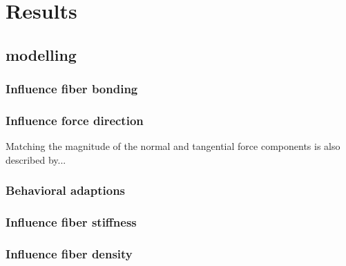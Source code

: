 \chapter{Results}\label{ch:results}

\section{modelling}

\subsection{Influence fiber bonding}\label{sec:results_fiber_bonding}
\subsection{Influence force direction}\label{sec:results_force_direction}
Matching the magnitude of the normal and tangential force components is also described by...
\subsection{Behavioral adaptions}\label{sec:results_behavioral_adaptions}
\subsection{Influence fiber stiffness}\label{sec:results_fiber_stiffness}
\subsection{Influence fiber density}\label{sec:results_fiber_density}
\subsection{}\label{sec:results_}
\subsection{}\label{sec:results_}
\subsection{}\label{sec:results_}









